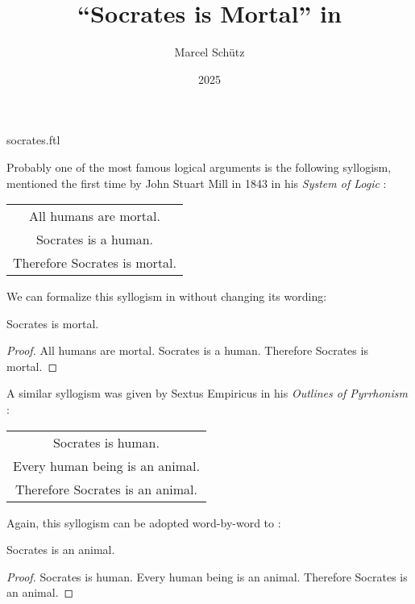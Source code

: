 \documentclass{stex}
\title{``Socrates is Mortal'' in \Naproche}
\author{Marcel Schütz}
\date{2025}
\begin{document}
\begin{smodule}{socrates.ftl}
\maketitle


\noindent Probably one of the most famous logical arguments is the following
syllogism, mentioned the first time by John Stuart Mill in 1843
\cite{Wheeler2023} in his \textit{System of Logic}
\cite[Book II, Chapter 3]{Mill1843}:
\begin{center}
  \begin{tabular}{c}
    All humans are mortal. \\
    Socrates is a human. \\
    \hline
    Therefore Socrates is mortal.
  \end{tabular}
\end{center}
We can formalize this syllogism in \Naproche without changing its wording:

\begin{forthel}
  \begin{theorem}[title=Mill's Syllogism,id=mill_syllogism]
    Socrates is mortal.
  \end{theorem}
  \begin{proof}
    All humans are mortal.
    Socrates is a human.
    Therefore Socrates is mortal.
  \end{proof}
\end{forthel}

A similar syllogism was given by Sextus Empiricus in his \textit{Outlines of
Pyrrhonism} \cite{SextusEmpiricus1933}:
\begin{center}
  \begin{tabular}{c}
    Socrates is human. \\
    Every human being is an animal. \\
    \hline
    Therefore Socrates is an animal.
  \end{tabular}
\end{center}
Again, this syllogism can be adopted word-by-word to \Naproche:

\begin{forthel}
  \begin{theorem}[title=Sextus Empiricus' Syllogism,id=sextus_empiricus_syllogism]
    Socrates is an animal.
  \end{theorem}
  \begin{proof}
    Socrates is human.
    Every human being is an animal.
    Therefore Socrates is an animal.
  \end{proof}
\end{forthel}

\printbibliography
{}

\end{smodule}
\end{document}
